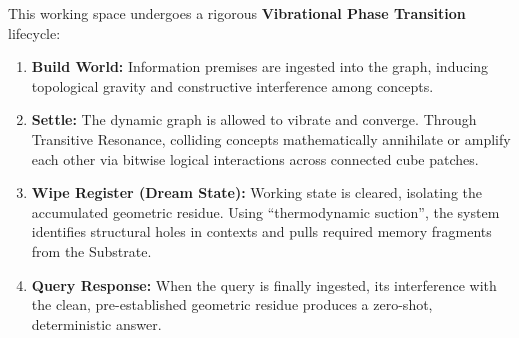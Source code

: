 This working space undergoes a rigorous \textbf{Vibrational Phase Transition} lifecycle:
\begin{enumerate}[nosep]
    \item \textbf{Build World:} Information premises are ingested into the graph, inducing topological gravity and constructive interference among concepts.
    \item \textbf{Settle:} The dynamic graph is allowed to vibrate and converge. Through Transitive Resonance, colliding concepts mathematically annihilate or amplify each other via bitwise logical interactions across connected cube patches.
    \item \textbf{Wipe Register (Dream State):} Working state is cleared, isolating the accumulated geometric residue. Using ``thermodynamic suction'', the system identifies structural holes in contexts and pulls required memory fragments from the Substrate.
    \item \textbf{Query Response:} When the query is finally ingested, its interference with the clean, pre-established geometric residue produces a zero-shot, deterministic answer.
\end{enumerate}
